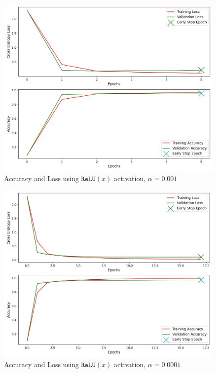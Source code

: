 \begin{figure}[H]
	\centering
	\includegraphics[width=1.0\textwidth]{./images/activation_relu.png}
	\caption{Accuracy and Loss using $\texttt{ReLU}(x)$ activation, $\alpha = 0.001$}
	\label{fig:relu}
\end{figure}

\begin{figure}[H]
	\centering
	\includegraphics[width=1.0\textwidth]{./images/activation_relu2.png}
	\caption{Accuracy and Loss using $\texttt{ReLU}(x)$ activation, $\alpha = 0.0001$}
	\label{fig:relu2}
\end{figure}
